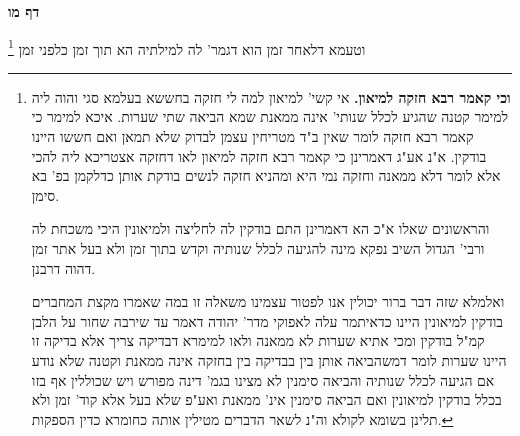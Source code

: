 \documentclass[12pt, openany]{book}
\newcommand{\sethebfont}{
\fontsize{10.5pt}{21.0pt} \selectfont
}
\newcommand{\twocol}[1]{
	{\sethebfont \begin{multicols}{2}
			#1
	\end{multicols}}	
}
\newcommand{\sectname}{}
\newcommand{\newsection}[1]{
	\addcontentsline{toc}{section}{#1}
	\renewcommand{\sectname}{#1}	
	\vspace{-\baselineskip}
	\begin{center}
		\textbf{%
\fontsize{16pt}{16pt}\selectfont
			#1}
	\end{center}
	\vspace{-\baselineskip}
	\nopagebreak
}
\newcommand{\footnotecomment}[1]{\footnote{#1}}
\newcommand{\commenta}[1]{\footnotecomment{#1}}
\begin{document}
\newsection{דף מו}
\twocol{וטעמא דלאחר זמן הוא דגמר' לה למילתיה הא תוך זמן כלפני זמן 
\commenta{\textbf{וכי קאמר רבא חזקה למיאון.}  אי קשי' למיאון למה לי חזקה בחששא בעלמא סגי והוה ליה למימר קטנה שהגיע לכלל שנותי' אינה ממאנת שמא הביאה שתי שערות. איכא למימר כי קאמר רבא חזקה לומר שאין ב"ד מטריחין עצמן לבדוק שלא תמאן ואם חששו היינו בודקין. א"נ אע"ג דאמרינן כי קאמר רבא חזקה למיאון לאו דחזקה אצטריכא ליה להכי אלא לומר דלא ממאנה וחזקה נמי היא ומהניא חזקה לנשים בודקת אותן כדלקמן בפ' בא סימן.\par והראשונים שאלו א"כ הא דאמרינן התם בודקין לה לחליצה ולמיאונין היכי משכחת לה ורבי' הגדול השיב נפקא מינה להגיעה לכלל שנותיה וקדש בתוך זמן ולא בעל אתר זמן דהוה דרבנן.\par  ואלמלא שזה דבר ברור יכולין אנו לפטור עצמינו משאלה זו במה שאמרו מקצת המחברים בודקין למיאונין היינו כדאיתמר עלה לאפוקי מדר' יהודה דאמר עד שירבה שחור על הלבן קמ"ל בודקין ומכי אתיא שערות לא ממאנה ולאו למימרא דבדיקה צריך אלא בדיקה זו היינו שערות לומר דמשהביאה אותן בין בבדיקה בין בחזקה אינה ממאנת וקטנה שלא נודע אם הגיעה לכלל שנותיה והביאה סימנין לא מצינו בגמ' דינה מפורש ויש שכוללין אף בזו בכלל בודקין למיאונין ואם הביאה סימנין אינ' ממאנת ואע"פ שלא בעל אלא קוד' זמן ולא תלינן בשומא לקולא וה"נ לשאר הדברים מטילין אותה כחומרא כדין הספקות. }

}
\end{document}

